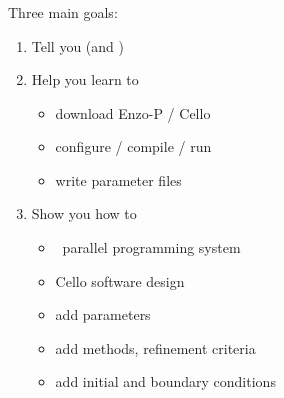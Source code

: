 \NEWSEC


\begin{frame}[fragile,label=ss-purpose] 
\frametitle{\ssPurpose}

Three main goals:
\begin{enumerate}
\item Tell you  (and )
\item Help you learn to 
\begin{itemize}
\item download Enzo-P / Cello
\item configure / compile / run
\item write parameter files
\end{itemize}
\item Show you how to 
\begin{itemize}
\item \charm\ parallel programming system
\item Cello software design
\item add parameters
\item add methods, refinement criteria
\item add initial and boundary conditions
\end{itemize}
\end{enumerate}
\end{frame}

